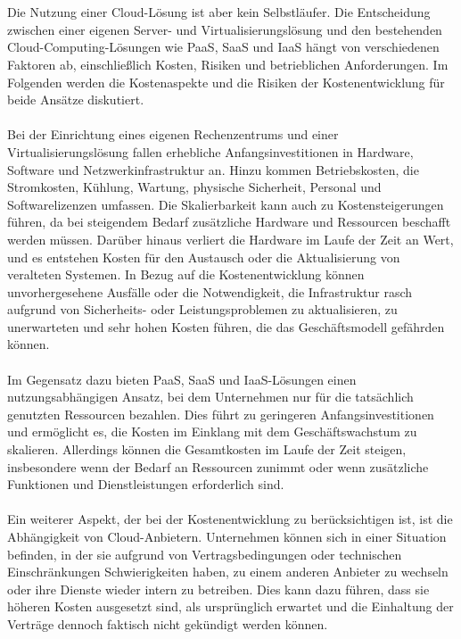 \documentclass[../vs-script-first-v01.tex]{subfiles}
\begin{document}
\\\\
Die Nutzung einer Cloud-Lösung ist aber kein Selbstläufer. Die Entscheidung zwischen einer eigenen Server- und Virtualisierungslösung und den bestehenden Cloud-Computing-Lösungen wie PaaS, SaaS und IaaS hängt von verschiedenen Faktoren ab, einschließlich Kosten, Risiken und betrieblichen Anforderungen. Im Folgenden werden die Kostenaspekte und die Risiken der Kostenentwicklung für beide Ansätze diskutiert.
\\\\
Bei der Einrichtung eines eigenen Rechenzentrums und einer Virtualisierungslösung fallen erhebliche Anfangsinvestitionen in Hardware, Software und Netzwerkinfrastruktur an. Hinzu kommen Betriebskosten, die Stromkosten, Kühlung, Wartung, physische Sicherheit, Personal und Softwarelizenzen umfassen. Die Skalierbarkeit kann auch zu Kostensteigerungen führen, da bei steigendem Bedarf zusätzliche Hardware und Ressourcen beschafft werden müssen. Darüber hinaus verliert die Hardware im Laufe der Zeit an Wert, und es entstehen Kosten für den Austausch oder die Aktualisierung von veralteten Systemen. In Bezug auf die Kostenentwicklung können unvorhergesehene Ausfälle oder die Notwendigkeit, die Infrastruktur rasch aufgrund von Sicherheits- oder Leistungsproblemen zu aktualisieren, zu unerwarteten und sehr hohen Kosten führen, die das Geschäftsmodell gefährden können.
\\\\
Im Gegensatz dazu bieten PaaS, SaaS und IaaS-Lösungen einen nutzungsabhängigen Ansatz, bei dem Unternehmen nur für die tatsächlich genutzten Ressourcen bezahlen. Dies führt zu geringeren Anfangsinvestitionen und ermöglicht es, die Kosten im Einklang mit dem Geschäftswachstum zu skalieren. Allerdings können die Gesamtkosten im Laufe der Zeit steigen, insbesondere wenn der Bedarf an Ressourcen zunimmt oder wenn zusätzliche Funktionen und Dienstleistungen erforderlich sind.
\\\\
Ein weiterer Aspekt, der bei der Kostenentwicklung zu berücksichtigen ist, ist die Abhängigkeit von Cloud-Anbietern. Unternehmen können sich in einer Situation befinden, in der sie aufgrund von Vertragsbedingungen oder technischen Einschränkungen Schwierigkeiten haben, zu einem anderen Anbieter zu wechseln oder ihre Dienste wieder intern zu betreiben. Dies kann dazu führen, dass sie höheren Kosten ausgesetzt sind, als ursprünglich erwartet und die Einhaltung der Verträge dennoch faktisch nicht gekündigt werden können.
\end{document}
